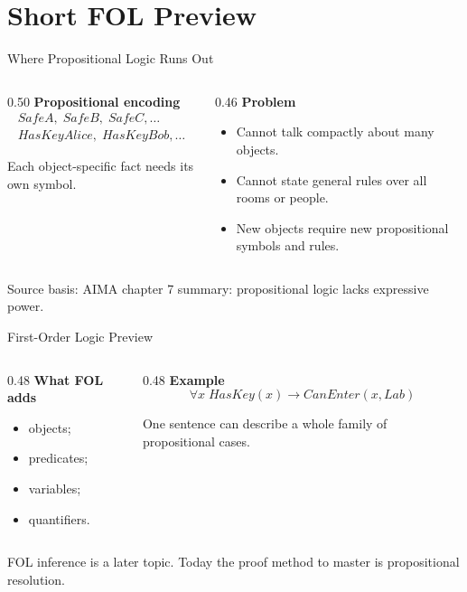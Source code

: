 \documentclass[aspectratio=169,11pt]{beamer}
\newcommand{\minihead}[1]{\textbf{\color{unswblue}#1}}
\newcommand{\source}[1]{\vfill{\scriptsize\color{darkgrey}Source basis: #1}}
\begin{document}
\section{Short FOL Preview}

\begin{frame}{Where Propositional Logic Runs Out}
  \begin{columns}[T,onlytextwidth]
    \begin{column}{0.50\textwidth}
      \minihead{Propositional encoding}
      \[
      \begin{aligned}
        SafeA,\; SafeB,\; SafeC,\ldots\\
        HasKeyAlice,\; HasKeyBob,\ldots
      \end{aligned}
      \]

      Each object-specific fact needs its own symbol.
    \end{column}
    \begin{column}{0.46\textwidth}
      \minihead{Problem}
      \begin{itemize}
        \item Cannot talk compactly about many objects.
        \item Cannot state general rules over all rooms or people.
        \item New objects require new propositional symbols and rules.
      \end{itemize}
    \end{column}
  \end{columns}

  \source{AIMA chapter 7 summary: propositional logic lacks expressive power.}
\end{frame}

\begin{frame}{First-Order Logic Preview}
  \begin{columns}[T,onlytextwidth]
    \begin{column}{0.48\textwidth}
      \minihead{What FOL adds}
      \begin{itemize}
        \item objects;
        \item predicates;
        \item variables;
        \item quantifiers.
      \end{itemize}
    \end{column}
    \begin{column}{0.48\textwidth}
      \minihead{Example}
      \[
        \forall x\; HasKey(x) \rightarrow CanEnter(x,Lab)
      \]

      One sentence can describe a whole family of propositional cases.
    \end{column}
  \end{columns}

  \vspace{0.8em}
  FOL inference is a later topic. Today the proof method to master is propositional resolution.
\end{frame}
\end{document}
